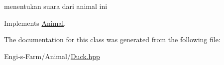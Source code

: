 menentukan suara dari animal ini 

Implements \mbox{\hyperlink{class_animal_aca8216576b21b87f761a34686a4968a8}{Animal}}.



The documentation for this class was generated from the following file\+:\begin{DoxyCompactItemize}
\item 
Engi-\/s-\/\+Farm/\+Animal/\mbox{\hyperlink{_duck_8hpp}{Duck.\+hpp}}\end{DoxyCompactItemize}
